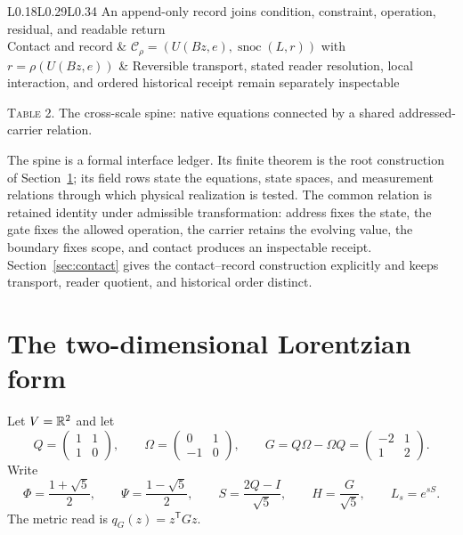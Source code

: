 \begin{center}
\begin{longtable}{L{0.18\linewidth}L{0.29\linewidth}L{0.34\linewidth}}
An append-only record joins condition, constraint, operation, residual, and
readable return\\
\addlinespace
Contact and record &
$\mathcal C_\rho=(U(Bz,e),\operatorname{snoc}(L,r))$ with
$r=\rho(U(Bz,e))$ &
Reversible transport, stated reader resolution, local interaction, and ordered
historical receipt remain separately inspectable\\
\bottomrule
\end{longtable}
\par\smallskip
\textsc{Table 2.} The cross-scale spine: native equations connected by a
shared addressed-carrier relation.
\end{center}

The spine is a formal interface ledger.  Its finite theorem is the root
construction of Section~\ref{sec:root}; its field rows state the equations,
state spaces, and measurement relations through which physical realization is
tested.  The common relation is retained identity under admissible
transformation: address fixes the state, the gate fixes the allowed operation,
the carrier retains the evolving value, the boundary fixes scope, and contact
produces an inspectable receipt.  Section~\ref{sec:contact} gives the
contact--record construction explicitly and keeps transport, reader quotient,
and historical order distinct.

\section{The two-dimensional Lorentzian form}
\label{sec:root}

\begin{definition}
Let $V=\mathbb R^2$ and let
\[
Q=\begin{pmatrix}1&1\\1&0\end{pmatrix},\qquad
\Omega=\begin{pmatrix}0&1\\-1&0\end{pmatrix},\qquad
G=Q\Omega-\Omega Q
=\begin{pmatrix}-2&1\\1&2\end{pmatrix}.
\tag{1}
\]
Write
\[
\Phi=\frac{1+\sqrt5}{2},\qquad
\Psi=\frac{1-\sqrt5}{2},\qquad
S=\frac{2Q-I}{\sqrt5},\qquad
H=\frac{G}{\sqrt5},\qquad
L_s=e^{sS}.
\tag{2}
\]
The metric read is $q_G(z)=z^{\mathsf T}Gz$.
\end{definition}

